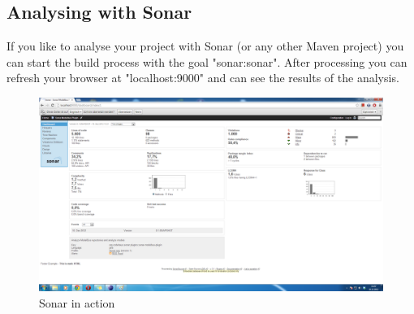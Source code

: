 \subsection{Analysing with Sonar}
If you like to analyse your project with Sonar (or any other Maven project) you can start the build process with the goal "sonar:sonar". After processing you can refresh your browser at "localhost:9000" and can see the results of the analysis.

\begin{figure}
	\centering
		\includegraphics[width=\textwidth]{sonarinaction}
	\caption{Sonar in action}
	\label{fig:sonarinaction}
\end{figure}